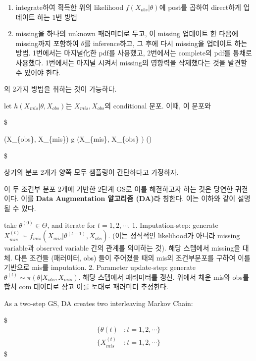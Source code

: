 \documentclass[
]{book}
\providecommand{\tightlist}{%
  \setlength{\itemsep}{0pt}\setlength{\parskip}{0pt}}
\begin{document}
\begin{enumerate}
\def\labelenumi{\arabic{enumi}.}
\tightlist
\item
  integrate하여 획득한 위의 likelihood \(f(X_{obs} \rvert \theta)\)에 post를 곱하여 direct하게 업데이트 하는 1번 방법
\item
  missing을 하나의 unknown 패러미터로 두고, 이 missing 업데이트 한 다음에 missing까지 포함하여 \(\theta\)를 inference하고, 그 후에 다시 missing을 업데이트 하는 방법. 1번에서는 마지널化한 pdf를 사용했고, 2번에서는 complete의 pdf를 통채로 사용했다. 1번에서는 마지널 시켜서 missing의 영향력을 삭제했다는 것을 발견할 수 있어야 한다.
\end{enumerate}

의 2가지 방법을 취하는 것이 가능하다.

let \(h( X_{mis} \lvert \theta, X_{obs})\)는 \(X_{mis}, X_{obs}\)의 conditional 분포. 이때, 이 분포와

\$

\pi (\theta \lvert X\_\{obs\}, X\_\{mis\}) \propto g (X\_\{mis\}, X\_\{obs\} \rvert \theta) \pi(\theta) 

\$

상기의 분포 2개가 양쪽 모두 샘플링이 간단하다고 가정하자.

이 두 조건부 분포 2개에 기반한 2단계 GS로 이를 해결하고자 하는 것은 당연한 귀결이다. 이를 \textbf{Data Augmentation 알고리즘 (DA)}라 칭한다. 이는 이하와 같이 설명될 수 있다.

take \(\theta^{(0)} \in \Theta\), and iterate for \(t=1,2, \cdots\).
1. Imputation-step: generate \(X_{mis}^{(t)} \sim f_{mis}(X_{mis} \rvert \theta^{(t-1)}, X_{obs})\). (이는 정식적인 likelihood가 아니라 missing variable과 observed variable 간의 관계를 의미하는 것). 해당 스텝에서 missing을 대체. 다른 조건들 (패러미터, obs) 들이 주어졌을 때의 mis의 조건부분포를 구하여 이를 기반으로 mis를 imputation.
2. Parameter update-step: generate \(\theta^{(t)} \sim \pi (\theta \lvert X_{obs}, X_{mis} )\). 해당 스텝에서 패러미터를 갱신. 위에서 채운 mis와 obs를 합쳐 com 데이터로 삼고 이를 토대로 패러미터 추정한다.

As a two-step GS, DA creates two interleaving Markov Chain:

\$
\begin{align*}

\{ \theta(t) &: t=1,2,\cdots \} \\
\{ X_{mis}^{(t)} &: t=1,2,\cdots \}

\end{align*}
\$
\end{document}
